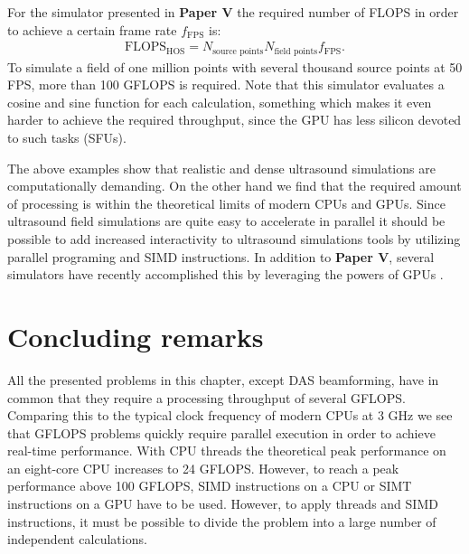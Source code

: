 For the simulator presented in \textbf{Paper V} the required number of FLOPS in order to achieve a certain frame rate $f_{\text{FPS}}$ is:
\begin{align}
\text{FLOPS}_{\text{HOS}} = N_{\text{source points}}N_{\text{field points}}f_{\text{FPS}}.
\end{align}
To simulate a field of one million points with several thousand source points at 50 FPS, more than 100 GFLOPS is required. Note that this simulator evaluates a cosine and sine function for each calculation, something which makes it even harder to achieve the required throughput, since the GPU has less silicon devoted to such tasks (SFUs).

The above examples show that realistic and dense ultrasound simulations are computationally demanding. On the other hand we find that the required amount of processing is within the theoretical limits of modern CPUs and GPUs. Since ultrasound field simulations are quite easy to accelerate in parallel it should be possible to add increased interactivity to ultrasound simulations tools by utilizing parallel programing and SIMD instructions. In addition to \textbf{Paper V}, several simulators have recently accomplished this by leveraging the powers of GPUs \cite{Gjerald2012, Reichl2009, Hlawitschka2011}.

\section{Concluding remarks}
All the presented problems in this chapter, except DAS beamforming, have in common that they require a processing throughput of several GFLOPS. Comparing this to the typical clock frequency of modern CPUs at 3 GHz we see that GFLOPS problems quickly require parallel execution in order to achieve real-time performance. With CPU threads the theoretical peak performance on an eight-core CPU increases to 24 GFLOPS. However, to reach a peak performance above 100 GFLOPS, SIMD instructions on a CPU or SIMT instructions on a GPU have to be used. However, to apply threads and SIMD instructions, it must be possible to divide the problem into a large number of independent calculations.	

\endinput
